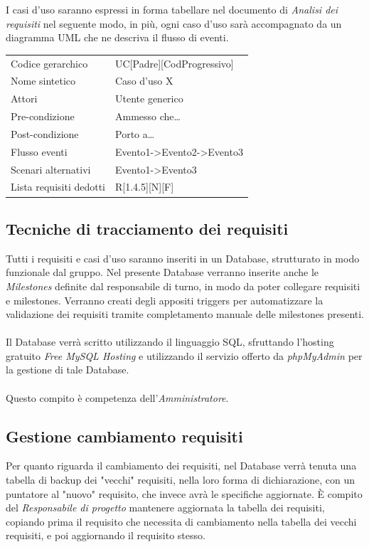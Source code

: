 \documentclass[a4paper]{report}
\begin{document}
		 I casi d'uso saranno espressi in forma tabellare nel documento di \emph{Analisi dei requisiti}
		 nel seguente modo, in più, ogni caso d'uso sarà accompagnato da un diagramma UML che ne
		 descriva il flusso di eventi.
		 \begin{table}[H]
			\begin{tabularx}{\textwidth}{X | X}\toprule
				\rowcolor{orange!65}Codice gerarchico & UC[Padre][CodProgressivo] \\
				Nome sintetico & Caso d'uso X \\
				\rowcolor{orange!65}Attori & Utente generico\\
				Pre-condizione & Ammesso che\dots \\
				\rowcolor{orange!65}Post-condizione & Porto a\dots \\
				Flusso eventi & Evento1->Evento2->Evento3\\
				\rowcolor{orange!65}Scenari alternativi & Evento1->Evento3\\
				Lista requisiti dedotti & R[1.4.5][N][F]\\
				\bottomrule
			\end{tabularx}
		 \end{table}

	\subsection{Tecniche di tracciamento dei requisiti}
		Tutti i requisiti e casi d'uso saranno inseriti in un Database, strutturato in modo funzionale
		 dal gruppo. Nel presente Database verranno 	inserite anche le \emph{Milestones} definite 
		 dal responsabile di turno, in modo da poter collegare requisiti e milestones. Verranno 
		 creati degli appositi triggers per automatizzare la validazione dei requisiti tramite
		  completamento manuale delle	milestones presenti. 
		\\ \\ 
		Il Database verrà scritto utilizzando il linguaggio SQL, sfruttando l'hosting gratuito
		\emph{Free MySQL Hosting} e utilizzando il servizio offerto da \emph{phpMyAdmin} per
		la gestione di tale Database.
		\\ \\
		Questo compito è competenza dell'\emph{Amministratore}.
	\subsection{Gestione cambiamento requisiti}
	Per quanto riguarda il cambiamento dei requisiti, nel Database verrà tenuta una tabella di backup dei "vecchi" requisiti, 
	nella loro forma di dichiarazione, con un puntatore al "nuovo" requisito, che invece avrà le specifiche aggiornate. È compito del
	\emph{Responsabile di progetto} mantenere aggiornata la tabella dei requisiti, copiando prima il requisito che necessita di cambiamento
	nella tabella dei vecchi requisiti, e poi aggiornando il requisito stesso.
	
\end{document}

